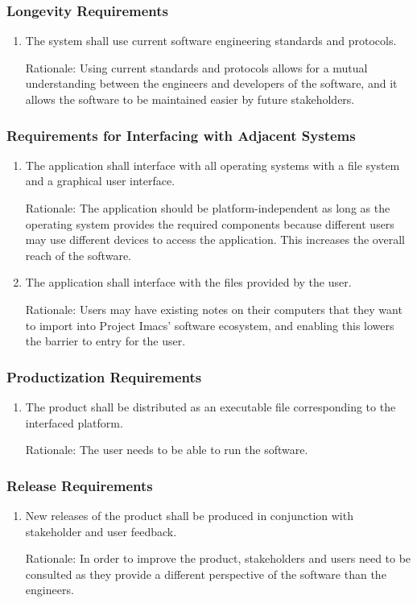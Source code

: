 \documentclass{article}
\begin{document}
\subsubsection{Longevity Requirements}
\begin{enumerate}[LOR1]
    \item The system shall use current software engineering standards and protocols.

	Rationale: Using current standards and protocols allows for a mutual understanding between the engineers and developers of the software, and it allows the software to be maintained easier by future stakeholders.
\end{enumerate}

\subsubsection{Requirements for Interfacing with Adjacent Systems}
\begin{enumerate}[R{I}{A}1]
    \item The application shall interface with all operating systems with a file system and a graphical user interface.

	Rationale: The application should be platform-independent as long as the operating system provides the required components because different users may use different devices to access the application. This increases the overall reach of the software.
    \item The application shall interface with the files provided by the user.

	Rationale: Users may have existing notes on their computers that they want to import into Project Imacs' software ecosystem, and enabling this lowers the barrier to entry for the user.
\end{enumerate}

\subsubsection{Productization Requirements}
\begin{enumerate}[PRO1]
    \item The product shall be distributed as an executable file corresponding to the interfaced platform.

	Rationale: The user needs to be able to run the software.
\end{enumerate}

\subsubsection{Release Requirements}
\begin{enumerate}[RR1]
    \item New releases of the product shall be produced in conjunction with stakeholder and user feedback.

	Rationale: In order to improve the product, stakeholders and users need to be consulted as they provide a different perspective of the software than the engineers.
\end{enumerate}
\end{document}

